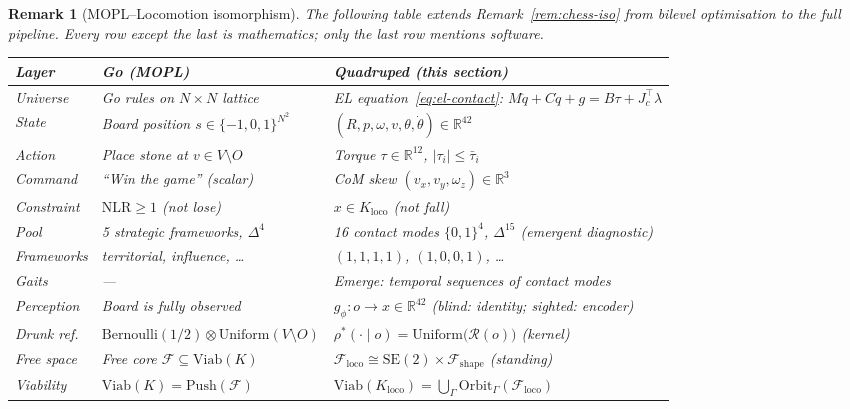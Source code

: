 \documentclass[11pt,a4paper]{article}
\newtheorem{remark}[theorem]{Remark}
\newcommand{\R}{\mathbb{R}}
\newcommand{\cF}{\mathcal{F}}
\newcommand{\cR}{\mathcal{R}}
\begin{document}
\begin{remark}[MOPL--Locomotion isomorphism]
\label{rem:mopl-locomotion-iso}
The following table extends
Remark~\ref{rem:chess-iso}
from bilevel optimisation to the full pipeline.
Every row except the last is mathematics;
only the last row mentions software.

\medskip
\begin{center}
\small
\begin{tabular}{@{}lp{4.8cm}p{5.8cm}@{}}
\toprule
\textbf{Layer}
  & \textbf{Go (MOPL)}
  & \textbf{Quadruped (this section)} \\
\midrule
Universe
  & Go rules on $N \times N$ lattice
  & EL equation~\eqref{eq:el-contact}:
    $M\ddot{q} + C\dot{q} + g
     = B\tau + J_c^{\!\top}\lambda$ \\[3pt]
State
  & Board position $s \in \{-1,0,1\}^{N^2}$
  & $(R, p, \omega, v, \theta, \dot{\theta})
    \in \R^{42}$ \\[3pt]
Action
  & Place stone at $v \in V \setminus O$
  & Torque $\tau \in \R^{12}$,
    $|\tau_i| \leq \bar{\tau}_i$ \\[3pt]
Command
  & ``Win the game'' (scalar)
  & CoM skew
    $(v_x, v_y, \omega_z) \in \R^3$ \\[3pt]
Constraint
  & $\mathrm{NLR} \geq 1$ (not lose)
  & $x \in K_{\mathrm{loco}}$ (not fall) \\[3pt]
Pool
  & 5 strategic frameworks, $\Delta^4$
  & 16 contact modes $\{0,1\}^4$,
    $\Delta^{15}$ (emergent diagnostic) \\[3pt]
Frameworks
  & territorial, influence, \ldots
  & $(1,1,1,1)$, $(1,0,0,1)$, \ldots \\[3pt]
Gaits
  & ---
  & Emerge: temporal sequences
    of contact modes \\[3pt]
Perception
  & Board is fully observed
  & $g_\phi: o \to x \in \R^{42}$
    (blind: identity; sighted: encoder) \\[3pt]
Drunk ref.
  & $\mathrm{Bernoulli}(1/2) \otimes
    \mathrm{Uniform}(V \setminus O)$
  & $\rho^*(\cdot \mid o)
    = \mathrm{Uniform}\!\bigl(\cR(o)\bigr)$
    (kernel) \\[3pt]
Free space
  & Free core $\cF \subseteq \mathrm{Viab}(K)$
  & $\cF_{\mathrm{loco}}
    \cong \mathrm{SE}(2) \times
    \cF_{\mathrm{shape}}$ (standing) \\[3pt]
Viability
  & $\mathrm{Viab}(K) = \mathrm{Push}(\cF)$
  & $\mathrm{Viab}(K_{\mathrm{loco}})
    = \bigcup_\Gamma
    \mathrm{Orbit}_\Gamma(\cF_{\mathrm{loco}})$ \\[3pt]

\end{tabular}
\end{center}
\end{remark}
\end{document}
